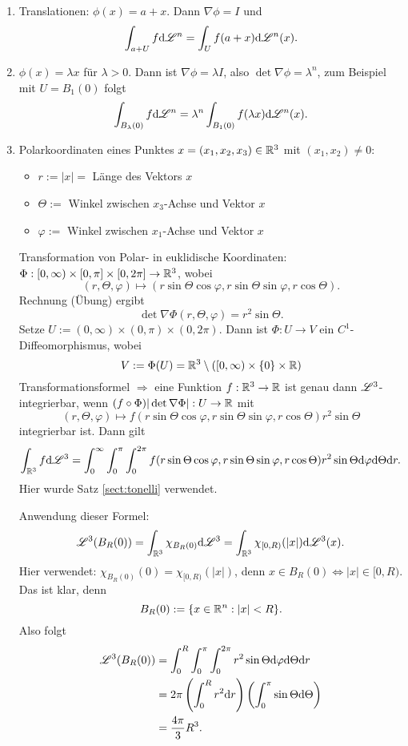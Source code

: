 \documentclass[
 a4paper,
 12pt,
 parskip=half
 ]{scrartcl}
\theoremstyle{plain}
\theoremstyle{definition}
\numberwithin{equation}{section}
\begin{document}
\begin{bsp}
 \begin{enumerate}
  \item Translationen: $\phi(x) = a + x$. Dann $\nabla \phi = I$ und 
  \[ \int_{a+U} f \mathrm{d} \mathscr{L}^n = \int_U f(a+x) \mathrm{d} \mathscr{L}^n(x). \]
  \item $\phi(x) = \lambda x$ für $\lambda > 0$. Dann ist $\nabla \phi = \lambda I$, also $\det \nabla \phi = \lambda^n$, zum Beispiel mit $U = B_1(0)$ folgt
  \[ \int_{B_\lambda(0)} f \mathrm{d} \mathscr{L}^n = \lambda^n \int_{B_1(0)} f(\lambda x) \mathrm{d} \mathscr{L}^n(x). \]
  \item Polarkoordinaten eines Punktes $x=(x_1,x_2,x_3) \in \mathbb{R}^3$ mit $(x_1,x_2) \ne 0$:
   \begin{itemize}
    \item $r := |x| =$ Länge des Vektors $x$
    \item $\Theta :=$ Winkel zwischen $x_3$-Achse und Vektor $x$
    \item $\varphi :=$ Winkel zwischen $x_1$-Achse und Vektor $x$
   \end{itemize}
   Transformation von Polar- in euklidische Koordinaten:$\Phi: [0, \infty) \times [0,\pi] \times [0,2\pi] \to \mathbb{R}^3$, wobei
   \[ (r,\Theta, \varphi) \mapsto ( r \sin \Theta \cos \varphi, r \sin \Theta \sin \varphi, r \cos \Theta ). \]
   Rechnung (Übung) ergibt
   \[ \det \nabla \Phi( r, \Theta, \varphi) = r^2 \sin \Theta. \]
   Setze $U := (0, \infty) \times (0,\pi) \times (0,2\pi)$. Dann ist $\Phi: U \to V$ ein $C^1$-Diffeomorphismus, wobei
   \[ V := \Phi(U) = \mathbb{R}^3 \setminus ( [0,\infty) \times \{ 0 \} \times \mathbb{R} ) \]
   Transformationsformel $\Rightarrow$ eine Funktion $f: \mathbb{R}^3 \to \mathbb{R}$ ist genau dann $\mathscr{L}^3$-integrierbar, wenn $(f \circ \Phi) | \det \nabla \Phi| : U \to \mathbb{R}$ mit
   \[ (r, \Theta, \varphi) \mapsto f( r \sin \Theta \cos \varphi, r \sin \Theta \sin \varphi, r \cos \Theta ) r^2 \sin \Theta \]
   integrierbar ist. Dann gilt
   \[ \int_{\mathbb{R}^3} f \mathrm{d} \mathscr{L}^3 = \int_0^\infty \int_0^\pi \int_0^{2 \pi} f( r \sin \Theta \cos \varphi, r \sin \Theta \sin \varphi, r \cos \Theta ) r^2 \sin \Theta \mathrm{d} \varphi \mathrm{d} \Theta \mathrm{d} r. \]
   Hier wurde Satz \ref{sect:tonelli} verwendet.
   
   Anwendung dieser Formel: 
   \[ \mathscr{L}^3( B_R(0) ) = \int_{\mathbb{R}^3} \chi_{B_R(0)} \mathrm{d} \mathscr{L}^3 = \int_{\mathbb{R}^3} \chi_{[0,R)}(|x|) \mathrm{d} \mathscr{L}^3 (x). \]
   Hier verwendet: $\chi_{B_R(0)}(0) = \chi_{[0,R)}(|x|)$, denn $x \in B_R(0) \Leftrightarrow |x| \in [0,R)$. Das ist klar, denn
   \[ B_R(0) := \{ x \in \mathbb{R}^n : |x| < R \}. \]
   Also folgt
   \[ \begin{aligned}       
      \mathscr{L}^3( B_R(0) ) 
      &= \int_0^R \int_0^\pi \int_0^{2 \pi} r^2 \sin \Theta \mathrm{d} \varphi \mathrm{d} \Theta \mathrm{d} r \\
      &= 2 \pi \left( \int_0^R r^2 \mathrm{d} r \right) \left( \int_0^\pi \sin \Theta \mathrm{d} \Theta \right) \\
      &= \frac{4 \pi}{3} R^3.
      \end{aligned} \]
 \end{enumerate}
\end{bsp}
\end{document}
